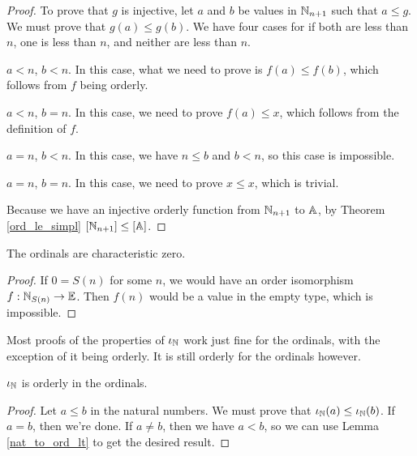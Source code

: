 \documentclass[../../math.tex]{subfiles}
\begin{document}
\begin{proof}
    To prove that $g$ is injective, let $a$ and $b$ be values in $\mathbb{N}_{n + 1}$
    such that $a \leq g$.  We must prove that $g(a) \leq g(b)$.  We have four
    cases for if both are less than $n$, one is less than $n$, and neither are
    less than $n$.
    \setcounter{case}{0}
    \begin{case} $a < n$, $b < n$.
        In this case, what we need to prove is $f(a) \leq f(b)$, which follows
        from $f$ being orderly.
    \end{case}
    \begin{case} $a < n$, $b = n$.
        In this case, we need to prove $f(a) \leq x$, which follows from the
        definition of $f$.
    \end{case}
    \begin{case} $a = n$, $b < n$.
        In this case, we have $n \leq b$ and $b < n$, so this case is
        impossible.
    \end{case}
    \begin{case} $a = n$, $b = n$.
        In this case, we need to prove $x \leq x$, which is trivial.
    \end{case}

    Because we have an injective orderly function from $\mathbb{N}_{n+1}$ to $\mathbb{A}$, by
    Theorem \ref{ord_le_simpl} $[\mathbb{N}_{n+1}] \leq [\mathbb{A}]$.
\end{proof}

\begin{instance}
    The ordinals are characteristic zero.
\end{instance}
\begin{proof}
    If $0 = S(n)$ for some $n$, we would have an order isomorphism $f :
    \mathbb{N}_{S(n)} \to \mathbb{E}$.  Then $f(n)$ would be a value in the empty type, which is
    impossible.
\end{proof}

Most proofs of the properties of $\iota_{\mathbb{N}}$ work just fine for the ordinals, with the
exception of it being orderly.  It is still orderly for the ordinals however.

\begin{instance}
    $\iota_{\mathbb{N}}$ is orderly in the ordinals.
\end{instance}
\begin{proof}
    Let $a \leq b$ in the natural numbers.  We must prove that $\iota_{\mathbb{N}}(a) \leq
    \iota_{\mathbb{N}}(b)$.  If $a = b$, then we're done.  If $a \neq b$, then we have $a < b$,
    so we can use Lemma \ref{nat_to_ord_lt} to get the desired result.
\end{proof}
\end{document}
